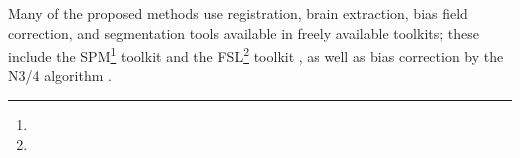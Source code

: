 Many of the proposed methods use registration, brain extraction, bias field correction, and segmentation tools available in freely available toolkits; these include the SPM\footnote{} toolkit
\cite{Sajja2006,Dyrby2008,Akselrod-Ballin2009,Smart2011,Schmidt2012,Yoo2014,Ithapu2014,Roy2015,Valverde2016} and the
FSL\footnote{} toolkit
\cite{Herskovits2008,Gibson2010,Datta2013,Steenwijk2013,Sweeney2013,Roy2015,Wang2015,Griffanti2016,Zhan2017},
as well as bias correction by the
N3/4
\cite{Tustison2010}
algorithm
\cite{Zijdenbos2002,Harmouche2006,Fartaria2015,Guizard2015,Harmouche2015,Mechrez2016,Valverde2016,Dadar2017,Zhan2017}.
